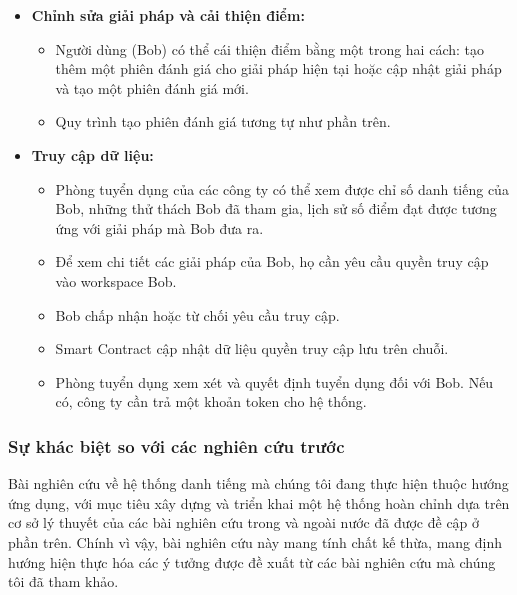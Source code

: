 \documentclass{article}[14pt]
\begin{document}
{\begin{enumerate}[label=\textbf{\alph*.}]
\begin{itemize}
                    \item \textbf{Chỉnh sửa giải pháp và cải thiện điểm:}
                    \begin{itemize} 
                        \item Người dùng (Bob) có thể cái thiện điểm bằng một trong hai cách: tạo thêm một phiên đánh giá cho giải pháp hiện tại hoặc cập nhật giải pháp và tạo một phiên đánh giá mới.
                        \item Quy trình tạo phiên đánh giá tương tự như phần trên.
                    \end{itemize} 

                    \item \textbf{Truy cập dữ liệu:}
                    \begin{itemize} 
                        \item Phòng tuyển dụng của các công ty có thể xem được chỉ số danh tiếng của Bob, những thử thách Bob đã tham gia, lịch sử số điểm đạt được tương ứng với giải pháp mà Bob đưa ra.
                        \item Để xem chi tiết các giải pháp của Bob, họ cần yêu cầu quyền truy cập vào workspace Bob.
                        \item Bob chấp nhận hoặc từ chối yêu cầu truy cập. 
                        \item Smart Contract cập nhật dữ liệu quyền truy cập lưu trên chuỗi. 
                        \item Phòng tuyển dụng xem xét và quyết định tuyển dụng đối với Bob. Nếu có, công ty cần trả một khoản token cho hệ thống. 
                    \end{itemize}
                \end{itemize}
            \end{enumerate}

        \subsubsection{Sự khác biệt so với các nghiên cứu trước}
            Bài nghiên cứu về hệ thống danh tiếng mà chúng tôi đang thực hiện thuộc hướng ứng dụng, với mục tiêu xây dựng và triển khai một hệ thống hoàn chỉnh dựa trên cơ sở lý thuyết của các bài nghiên cứu trong và ngoài nước đã được đề cập ở phần trên. Chính vì vậy, bài nghiên cứu này mang tính chất kế thừa, mang định hướng hiện thực hóa các ý tưởng được đề xuất từ các bài nghiên cứu mà chúng tôi đã tham khảo. 
    
}
\end{document}
